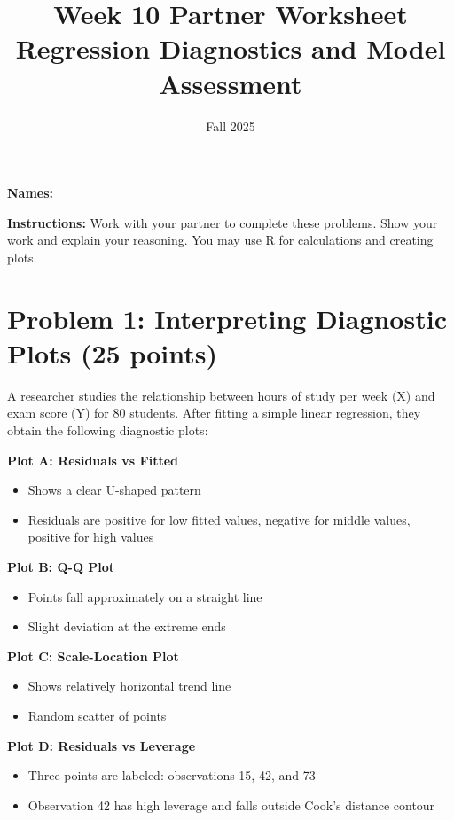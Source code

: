 \documentclass[11pt]{article}
\title{\textcolor{osaorange}{\textbf{Week 10 Partner Worksheet}}\\
\large{Regression Diagnostics and Model Assessment}}
\author{}
\date{Fall 2025}
\begin{document}
\maketitle

\noindent\textbf{Names:} \underline{\hspace{6cm}}

\vspace{0.5cm}

\noindent\textbf{Instructions:} Work with your partner to complete these problems. Show your work and explain your reasoning. You may use R for calculations and creating plots.

\section*{Problem 1: Interpreting Diagnostic Plots (25 points)}

A researcher studies the relationship between hours of study per week (X) and exam score (Y) for 80 students. After fitting a simple linear regression, they obtain the following diagnostic plots:

\vspace{0.3cm}

\textbf{Plot A: Residuals vs Fitted}
\begin{itemize}
\item Shows a clear U-shaped pattern
\item Residuals are positive for low fitted values, negative for middle values, positive for high values
\end{itemize}

\textbf{Plot B: Q-Q Plot}
\begin{itemize}
\item Points fall approximately on a straight line
\item Slight deviation at the extreme ends
\end{itemize}

\textbf{Plot C: Scale-Location Plot}
\begin{itemize}
\item Shows relatively horizontal trend line
\item Random scatter of points
\end{itemize}

\textbf{Plot D: Residuals vs Leverage}
\begin{itemize}
\item Three points are labeled: observations 15, 42, and 73
\item Observation 42 has high leverage and falls outside Cook's distance contour
\end{itemize}
\end{document}
